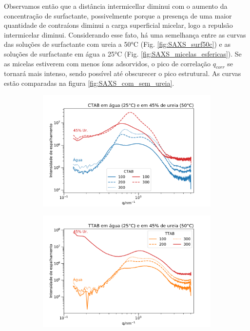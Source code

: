 	Observamos então que a distância intermicellar diminui com o aumento da concentração de surfactante, possivelmente porque a presença de uma maior quantidade de contraíons diminui a carga superficial micelar, logo a repulsão intermicelar diminui. Considerando esse fato, há uma semelhança entre as curvas das soluções de surfactante com ureia a 50°C (Fig. \ref{fig:SAXS_surf50c}) e as soluções de surfactante em água a 25°C (Fig. \ref{fig:SAXS_micelas_esfericas}). Se as micelas estiverem com menos íons adsorvidos, o pico de correlação \(q_{corr}\) se tornará mais intenso, sendo possível até obscurecer o pico estrutural. As curvas estão comparadas na figura \ref{fig:SAXS_com_sem_ureia}.
	
	
	\begin{figure}[h]
		\begin{subfigure}[t]{0.45\textwidth}
			\centering
			\includegraphics[width=\textwidth]{./imagens/saxs/micelas_CTAB_agua_ureia}
			\caption{\CTAB}
			\label{fig:SAXS_CTAB_com_sem_ureia}
		\end{subfigure} \qquad %
		\begin{subfigure}[t]{0.45\textwidth}
			\centering
			\includegraphics[width=\textwidth]{./imagens/saxs/micelas_TTAB_agua_ureia}

\end{subfigure}
\end{figure}
